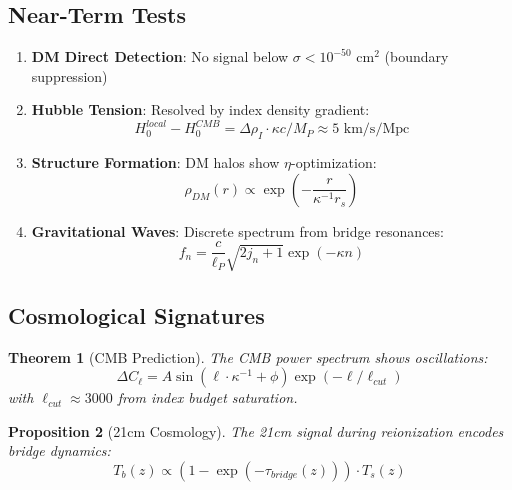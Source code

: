 \documentclass[11pt]{article}
\theoremstyle{plain}
\newtheorem{theorem}{Theorem}[section]
\newtheorem{proposition}[theorem]{Proposition}
\theoremstyle{definition}
\begin{document}
\subsection{Near-Term Tests}

\begin{enumerate}
  \item \textbf{DM Direct Detection}: No signal below $\sigma < 10^{-50}$ cm$^2$ (boundary suppression)

  \item \textbf{Hubble Tension}: Resolved by index density gradient:
    \begin{equation}
      H_0^{local} - H_0^{CMB} = \Delta\rho_I \cdot \kappa c/M_P \approx 5 \text{ km/s/Mpc}
    \end{equation}

  \item \textbf{Structure Formation}: DM halos show $\eta$-optimization:
    \begin{equation}
      \rho_{DM}(r) \propto \exp\left(-\frac{r}{\kappa^{-1} r_s}\right)
    \end{equation}

  \item \textbf{Gravitational Waves}: Discrete spectrum from bridge resonances:
    \begin{equation}
      f_n = \frac{c}{\ell_P} \sqrt{2j_n + 1} \exp(-\kappa n)
    \end{equation}
\end{enumerate}

\subsection{Cosmological Signatures}

\begin{theorem}[CMB Prediction]
  The CMB power spectrum shows oscillations:
  \begin{equation}
    \Delta C_\ell = A \sin\left(\ell \cdot \kappa^{-1} + \phi\right) \exp(-\ell/\ell_{cut})
  \end{equation}
  with $\ell_{cut} \approx 3000$ from index budget saturation.
\end{theorem}

\begin{proposition}[21cm Cosmology]
  The 21cm signal during reionization encodes bridge dynamics:
  \begin{equation}
    T_b(z) \propto \left(1 - \exp\left(-\tau_{bridge}(z)\right)\right) \cdot T_s(z)
  \end{equation}
\end{proposition}
\end{document}
